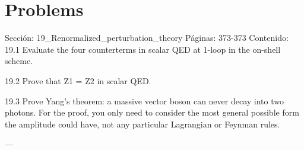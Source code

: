 \section*{Problems}
Sección: 19_Renormalized_perturbation_theory
Páginas: 373-373
Contenido:
19.1 Evaluate the four counterterms in scalar QED at 1-loop in the on-shell scheme.

19.2 Prove that Z1 = Z2 in scalar QED.

19.3 Prove Yang’s theorem: a massive vector boson can never decay into two photons. For
the proof, you only need to consider the most general possible form the amplitude
could have, not any particular Lagrangian or Feynman rules.


---

